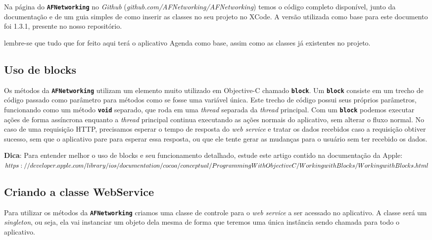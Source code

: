 \documentclass[a4paper,12pt,brazil,oneside]{book}
\begin{document}
Na página do \texttt{\textbf{AFNetworking}} no \emph{Github} (\textit{github.com/AFNetworking/AFNetworking}) temos o código completo disponível, junto da documentação e de um guia simples de como inserir as classes no seu projeto no XCode. A versão utilizada como base para este documento foi 1.3.1, presente no nosso repositório.

lembre-se que tudo que for feito aqui terá o aplicativo Agenda como base, assim como as classes já existentes no projeto.

\subsection{Uso de blocks}


Os métodos da \texttt{\textbf{AFNetworking}} utilizam um elemento muito utilizado em Objective-C chamado \texttt{\textbf{block}}. Um \texttt{\textbf{block}} consiste em um trecho de código passado como parâmetro para métodos como se fosse uma variável única. Este trecho de código possui seus próprios parâmetros, funcionando como um método \texttt{\textbf{void}} separado, que roda em uma \emph{thread} separada da \emph{thread} principal. Com um \texttt{\textbf{block}} podemos executar ações de forma assíncrona enquanto a \emph{thread} principal continua executando as ações normais do aplicativo, sem alterar o fluxo normal. No caso de uma requisição HTTP, precisamos esperar o tempo de resposta do \emph{web service} e tratar os dados recebidos caso a requisição obtiver sucesso, sem que o aplicativo pare para esperar essa resposta, ou que ele tente gerar as mudanças para o usuário sem ter recebido os dados.

\begin{framed}

\textbf{Dica}:  Para entender melhor o uso de blocks e seu funcionamento detalhado, estude este artigo contido na documentação da Apple:\\
\(https://developer.apple.com/library/ios/documentation/cocoa/conceptual/\\ProgrammingWithObjectiveC/WorkingwithBlocks/WorkingwithBlocks.html\)
\end{framed}

\subsection{Criando a classe WebService}


Para utilizar os métodos da \texttt{\textbf{AFNetworking}} criamos uma classe de controle para o \emph{web service} a ser acessado no aplicativo. A classe será um \emph{singleton}, ou seja, ela vai instanciar um objeto dela mesma de forma que teremos uma única instância sendo chamada para todo o aplicativo.
\end{document}
